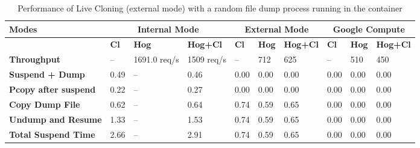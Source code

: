 \begin{table*}[ht]
  \centering
    \begin{tabular}{ | p{4cm} | l | l | l | l | l | l | l | l | l |}
    \hline
    \textbf{Modes} & \multicolumn{3}{|c|}{\textbf{Internal Mode}} & \multicolumn{3}{|c|}{\textbf{External Mode}} & \multicolumn{3}{|c|}{\textbf{Google Compute}}\\\hline
    \textbf{ } & \textbf{Cl} & \textbf{Hog} & \textbf{Hog+Cl} & \textbf{Cl} & \textbf{Hog} & \textbf{Hog+Cl} & \textbf{Cl} & \textbf{Hog} & \textbf{Hog+Cl} \\ \hline
    \hline
    \textbf{Throughput} & -- & 1691.0 req/s & 1509 req/s & -- & 712 & 625 & -- & 510 & 450\\ \hline
    \hline
    \textbf{Suspend + Dump} & 0.49 & -- & 0.46 & 0.00 & 0.00 & 0.00 & 0.00 & 0.00 & 0.00\\ \hline
    \textbf{Pcopy after suspend} & 0.22 & -- & 0.27 & 0.00 & 0.00 & 0.00 & 0.00 & 0.00 & 0.00\\ \hline
    \textbf{Copy Dump File} & 0.62 &  -- & 0.64 & 0.74 & 0.59 & 0.65 & 0.00 & 0.00 & 0.00\\ \hline
    \textbf{Undump and Resume} & 1.33 &  -- & 1.53 & 0.74 & 0.59 & 0.65 & 0.00 & 0.00 & 0.00\\ \hline 
    \hline
    \textbf{Total Suspend Time} & 2.66 &  -- & 2.91 & 0.74 & 0.59 & 0.65 & 0.00 & 0.00 & 0.00\\ \hline
    \end{tabular}
\caption{Performance of Live Cloning (external mode) with a random file dump process running in the container}
\label{table:clonePerf}
\end{table*}

